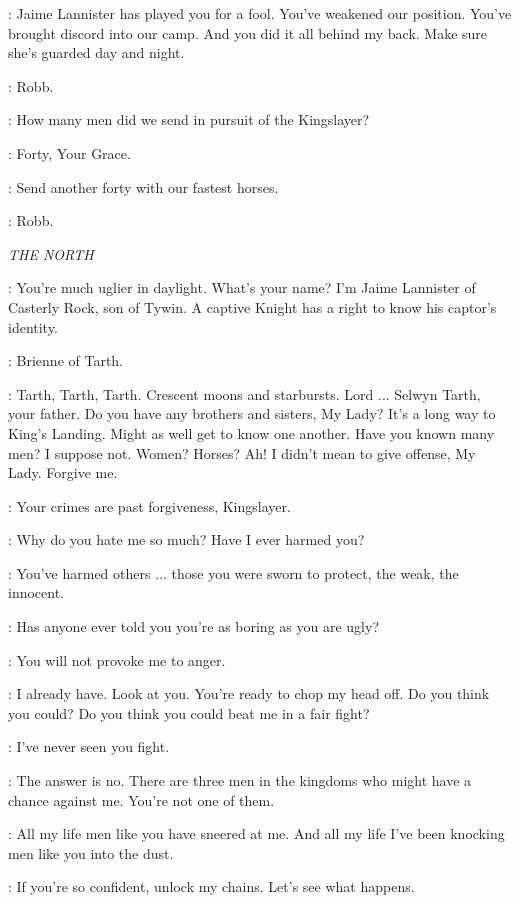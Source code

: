 \ROBB: Jaime Lannister has played you for a fool. You've weakened our position. You've brought discord into our camp. And you did it all behind my back. Make sure she's guarded day and night. 

\CATELYN: Robb. 

\ROBB: How many men did we send in pursuit of the Kingslayer? 

\KARSTARK: Forty, Your Grace. 

\ROBB: Send another forty with our fastest horses. 

\CATELYN: Robb. 


\scene

\textit{THE NORTH} 


\JAIME: You're much uglier in daylight. What's your name? I'm Jaime Lannister of Casterly Rock, son of Tywin. A captive Knight has a right to know his captor's identity. 

\BRIENNE: Brienne of Tarth. 

\JAIME: Tarth, Tarth, Tarth. Crescent moons and starbursts. Lord $\ldots$ Selwyn Tarth, your father. Do you have any brothers and sisters, My Lady? It's a long way to King's Landing. Might as well get to know one another. Have you known many men? I suppose not. Women? Horses? Ah! I didn't mean to give offense, My Lady. Forgive me. 

\BRIENNE: Your crimes are past forgiveness, Kingslayer. 

\JAIME: Why do you hate me so much? Have I ever harmed you? 

\BRIENNE: You've harmed others $\ldots$  those you were sworn to protect, the weak, the innocent. 

\JAIME: Has anyone ever told you you're as boring as you are ugly? 

\BRIENNE: You will not provoke me to anger. 

\JAIME: I already have. Look at you. You're ready to chop my head off. Do you think you could? Do you think you could beat me in a fair fight? 

\BRIENNE: I've never seen you fight. 

\JAIME: The answer is no. There are three men in the kingdoms who might have a chance against me. You're not one of them. 

\BRIENNE: All my life men like you have sneered at me. And all my life I've been knocking men like you into the dust. 

\JAIME: If you're so confident, unlock my chains. Let's see what happens. 

